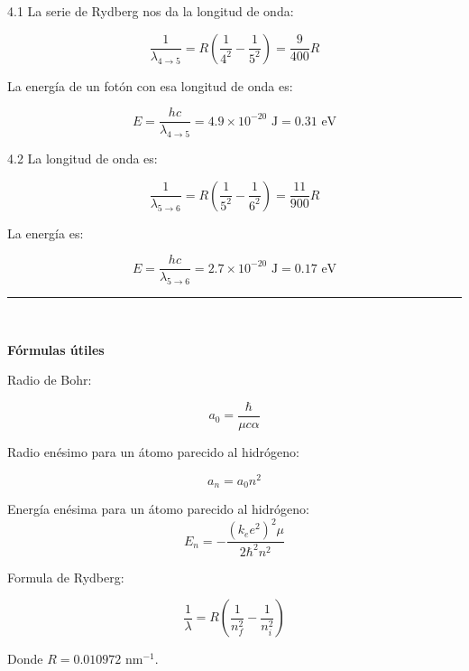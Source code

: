 \documentclass[12pt]{article}
\begin{document}
4.1 La serie de Rydberg nos da la longitud de onda:

\begin{equation*}
\frac{1}{\lambda_{4\rightarrow 5}} = R\left(\frac{1}{4^2}-\frac{1}{5^2}\right) = \frac{9}{400} R
\end{equation*}

La energía de un fotón con esa longitud de onda es:

\begin{equation*}
E = \frac{hc}{\lambda_{4\rightarrow 5}}  =4.9 \times 10^{-20} \text{ J} = 0.31  \text{ eV}
\end{equation*}



4.2 La longitud de onda es:

\begin{equation*}
\frac{1}{\lambda_{5\rightarrow 6}} = R\left(\frac{1}{5^2}-\frac{1}{6^2}\right) = \frac{11}{900} R
\end{equation*}

La energía es:

\begin{equation*}
E = \frac{hc}{\lambda_{5\rightarrow 6}}  =2.7 \times 10^{-20} \text{ J} = 0.17 \text{ eV}
\end{equation*}

\noindent\rule{16.5cm}{0.4pt}
\\



\begin{center}
	\textbf{Fórmulas útiles}
\end{center}



Radio de Bohr:

\begin{equation*}
a_0 = \frac{\hbar}{\mu c \alpha}
\end{equation*}

Radio enésimo para un átomo parecido al hidrógeno:

\begin{equation*}
a_n = a_0 n^2
\end{equation*}

Energía enésima para un átomo parecido al hidrógeno:
\begin{equation}
E_n = -\frac{(k_e e^2)^2 \mu }{2 \hbar^2 n^2}
\end{equation}

Formula de Rydberg:

\begin{equation*}
\frac{1}{\lambda} = R\left(\frac{1}{n_f^2}-\frac{1}{n_i^2}\right)
\end{equation*}

Donde $R = 0.010972$ nm$^{-1}$.
\end{document}
